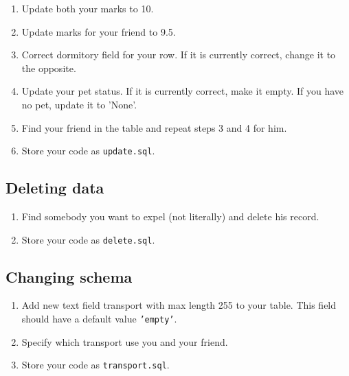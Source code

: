 \documentclass[12pt]{article}
\newcommand{\code}[1]{\texttt{#1}}
\begin{document}
\begin{enumerate}

\item Update both your marks to 10.

\item Update marks for your friend to 9.5.

\item Correct dormitory field for your row. If it is currently correct, change it to the opposite.

\item Update your pet status. If it is currently correct, make it empty. If you have no pet, update it to 'None'.

\item Find your friend in the table and repeat steps 3 and 4 for him.

\item Store your code as \code{update.sql}.

\end{enumerate}

\subsection*{Deleting data}

\begin{enumerate}

\item Find somebody you want to expel (not literally) and delete his record.

\item Store your code as \code{delete.sql}.

\end{enumerate}

\subsection*{Changing schema}

\begin{enumerate}

\item Add new text field transport with max length 255 to your table. This field should have a default value \code{'empty'}.

\item Specify which transport use you and your friend.

\item Store your code as \code{transport.sql}.

\end{enumerate}
\end{document}
